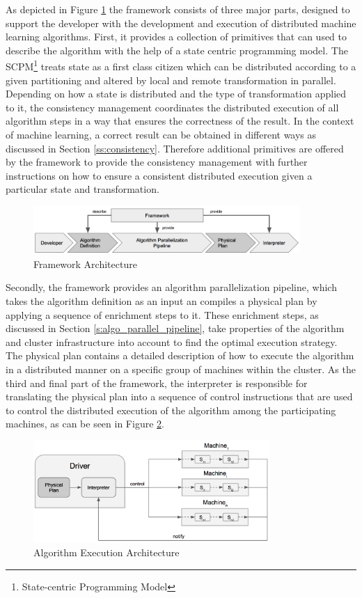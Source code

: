 As depicted in Figure \ref{fig:framework_architecture} the framework consists of three major parts, designed to support the developer with the development and execution of distributed machine learning algorithms.
First, it provides a collection of primitives that can used to describe the algorithm with the help of a state centric programming model.
The SCPM\footnote{State-centric Programming Model} treats state as a first class citizen which can be distributed according to a given partitioning and altered by local and remote transformation in parallel.
Depending on how a state is distributed and the type of transformation applied to it, the consistency management coordinates the distributed execution of all algorithm steps in a way that ensures the correctness of the result.
In the context of machine learning, a correct result can be obtained in different ways as discussed in Section \ref{ss:consistency}.
Therefore additional primitives are offered by the framework to provide the consistency management with further instructions on how to ensure a consistent distributed execution given a particular state and transformation.
\begin{figure}[ht]
\centering
\includegraphics[width=0.9\textwidth]{img/framework_architecture.png}
\caption{Framework Architecture}
\label{fig:framework_architecture}
\end{figure}
Secondly, the framework provides an algorithm parallelization pipeline, which takes the algorithm definition as an input an compiles a physical plan by applying a sequence of enrichment steps to it.
These enrichment steps, as discussed in Section \ref{s:algo_parallel_pipeline}, take properties of the algorithm and cluster infrastructure into account to find the optimal execution strategy.
The physical plan contains a detailed description of how to execute the algorithm in a distributed manner on a specific group of machines within the cluster.
As the third and final part of the framework, the interpreter is responsible for translating the physical plan into a sequence of control instructions that are used to control the distributed execution of the algorithm among the participating machines, as can be seen in Figure \ref{fig:framework_driver}.
\begin{figure}[ht]
\centering
\includegraphics[width=0.8\textwidth]{img/framework_driver.png}
\caption{Algorithm Execution Architecture}
\label{fig:framework_driver}
\end{figure}
